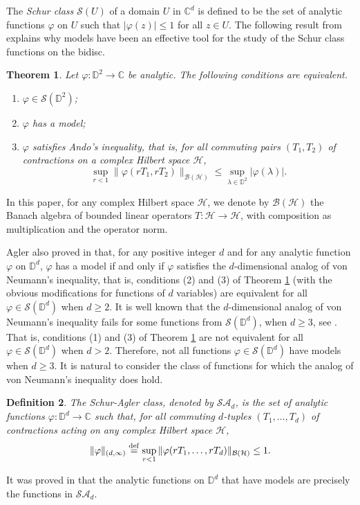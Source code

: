 \documentclass[11pt, reqno]{amsart}
\newtheorem{theorem}{Theorem}[section]
\newtheorem{definition}[theorem]{Definition}
\newcommand\1{\boldsymbol {1}}
\newcommand{\D}{\mathbb{D}}
\newcommand{\C}{\mathbb{C}}
\newcommand{\ph}{\varphi}
\newcommand\df{\stackrel{\rm def}{=}}
\numberwithin{equation}{section}
\begin{document}
The {\em Schur class} $\mathcal{S}(U)$ of a domain $U$ in $\mathbb{C}^d$ is defined to be the set of analytic functions $\ph$ on $U$ such that $|\ph(z)|\leq 1$ for all $z\in U$. The following result from \cite{Ag1} explains why models have been an effective tool for the study of the Schur class functions on  the bidisc.
\begin{theorem}\label{card2}
Let $\ph:\D^2 \to \C$ be analytic.  The following conditions are equivalent.
\begin{enumerate}
\item $\ph\in\mathcal{S}(\D^2)$;
\item $\ph$ has a model;
\item $\ph$ satisfies Ando's inequality, that is,
for all commuting pairs $(T_1,T_2)$ of contractions on a complex Hilbert space $\mathcal{H}$,
\[
\sup_{r<1}\|\ph(rT_1,rT_2)\|_{\mathcal{B}(\mathcal{H})} \leq \sup_{\lambda \in \D^2} | \ph(\lambda) |.
\]
\end{enumerate}
\end{theorem}
In this paper, for any complex Hilbert space $\mathcal{H}$, we denote by $\mathcal{B(\mathcal{H})}$ the Banach algebra of bounded linear operators $T: \mathcal{H}\rightarrow \mathcal{H}$, with composition as multiplication and the operator norm. 

Agler also proved in \cite{Ag1} that, for any positive integer $d$ and for any analytic function $\ph$ on $\D^d$, $\ph$ has a model if and only if $\ph$ satisfies  the $d$-dimensional analog of von Neumann's inequality, that is, conditions (2) and (3) of Theorem \ref{card2}  (with the obvious modifications for functions of $d$ variables)  are equivalent for all $\ph\in\mathcal{S}(\D^d)$ when $d \geq 2$.  It is well known that the $d$-dimensional analog of von Neumann's inequality fails for some functions from $ \mathcal{S}(\D^d)$, when $d \geq 3$, see \cite{Varopouloscite,crabbdavie}.
That is, conditions (1) and (3) of Theorem \ref{card2} are not equivalent for all $\ph\in\mathcal{S}(\D^d)$ when $d > 2$. 
Therefore,  not all functions $\ph\in\mathcal{S}(\D^d)$ have models when $d \geq 3$.
It is natural to consider the class of functions for which the  analog of von Neumann's inequality does hold.
\begin{definition}{}\label{schuraglerclassdefhere}
The {\em{Schur-Agler class}}, denoted by $\mathcal{SA}_{d}$, is the set of analytic functions $\varphi:\mathbb{D}^{d}\rightarrow \mathbb{C}$ such that, for all commuting $d$-tuples $(T_{1},\hdots, T_{d})$ of contractions acting on any complex Hilbert space $\mathcal{H}$,
$$\|\varphi\|_{(d,\infty)} \df \sup_{r<1} \| \varphi(rT_{1},\hdots, rT_{d}) \|_{\mathcal{B}(\mathcal{H})} \leq 1.$$
\end{definition}
\noindent It was proved in \cite{Ag1} that the analytic functions on $\D^d$ that have models are precisely the functions in 
 $\mathcal{SA}_d$. 
\end{document}
